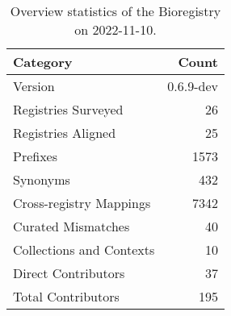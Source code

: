 \begin{table}
\centering
\caption{Overview statistics of the Bioregistry on 2022-11-10.}
\label{tab:bioregistry-summary}
\begin{tabular}{lr}
\toprule
                Category &     Count \\
\midrule
                 Version & 0.6.9-dev \\
     Registries Surveyed &        26 \\
      Registries Aligned &        25 \\
                Prefixes &      1573 \\
                Synonyms &       432 \\
 Cross-registry Mappings &      7342 \\
      Curated Mismatches &        40 \\
Collections and Contexts &        10 \\
     Direct Contributors &        37 \\
      Total Contributors &       195 \\
\bottomrule
\end{tabular}
\end{table}
